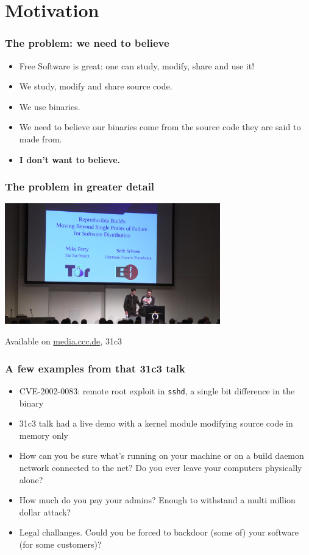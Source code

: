 \documentclass[14pt,aspectratio=169]{beamer}
\begin{document}
\section{Motivation}

\begin{frame}[fragile]
 \frametitle{The problem: we need to believe}
 \begin{itemize}
  \item Free Software is great: one can study, modify, share and use it!
  \item<2-4> We study, modify and share source code.
  \item<2-4> We use binaries.
  \item<3-4> We need to believe our binaries come from the source code they are said to made from.
  \item<4> \textbf{I don't want to believe.}
 
 \end{itemize}
\end{frame}

\begin{frame}
 \frametitle{The problem in greater detail}

 \begin{center}
  \includegraphics[width=0.7\textwidth]{images/31c3.png}

  Available on \url{media.ccc.de}, 31c3
 \end{center}
\end{frame}

\begin{frame}[fragile]
 \frametitle{A few examples from that 31c3 talk}
 \begin{itemize}
  \item CVE-2002-0083: remote root exploit in \texttt{sshd}, a single bit difference in the binary
  \item<2-5> 31c3 talk had a live demo with a kernel module modifying source code in memory only
  \item<3-5> How can you be sure what's running on your machine or on a build
  daemon network connected to the net? Do you ever leave your computers
  physically alone? 
  \item<4-5> How much do you pay your admins? Enough to withstand a multi million
  dollar attack?
  \item<5> Legal challanges. Could you be forced to backdoor (some of) your
  software (for some customers)?
 \end{itemize}
\end{frame}
\end{document}
